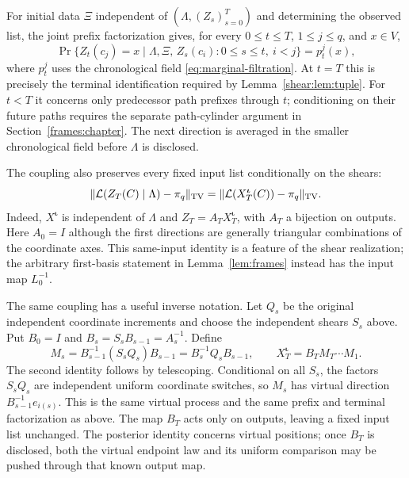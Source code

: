 For initial data $\Xi$ independent of $(\Lambda,(Z_s)_{s=0}^T)$
and determining the observed list, the joint prefix factorization
gives, for every $0\le t\le T$, $1\le j\le q$, and $x\in V$,
\begin{equation}\label{shear:eq:terminal-factorization}
 \Pr\{Z_t(c_j)=x\mid\Lambda,\Xi,\,
              Z_s(c_i):0\le s\le t,\ i<j\}
 =p_t^j(x),
\end{equation}
where $p_t^j$ uses the chronological field
\eqref{eq:marginal-filtration}. At $t=T$ this is precisely the
terminal identification required by Lemma~\ref{shear:lem:tuple}.
For $t<T$ it concerns only predecessor path prefixes through
$t$; conditioning on their future paths requires the separate
path-cylinder argument in Section~\ref{frames:chapter}.
The next direction is averaged in the smaller chronological field
before $\Lambda$ is disclosed.

The coupling also preserves every fixed input list conditionally
on the shears:
\begin{equation}\label{shear:eq:fixed-list-frame}
 \|\mathcal L(Z_T(C)\mid\Lambda)-\pi_q\|_{\mathrm{TV}}
 =\|\mathcal L(X^{\boldsymbol\iota}_T(C))-\pi_q\|_{\mathrm{TV}}.
\end{equation}
Indeed, $X^{\boldsymbol\iota}$ is independent of $\Lambda$ and
$Z_T=A_TX^{\boldsymbol\iota}_T$, with $A_T$ a bijection on
outputs. Here $A_0=I$ although the first directions are generally
triangular combinations of the coordinate axes. This same-input
identity is a feature of the shear realization; the arbitrary
first-basis statement in Lemma~\ref{lem:frames} instead has the
input map $L_0^{-1}$.

\begin{remark}
\label{shear:rem:factorization}
The same coupling has a useful inverse notation. Let $Q_s$ be
the original independent coordinate increments and choose the
independent shears $S_s$ above. Put
$B_0=I$ and $B_s=S_sB_{s-1}=A_s^{-1}$. Define
\begin{equation}\label{shear:eq:inverse-coupling}
 M_s=B_{s-1}^{-1}(S_sQ_s)B_{s-1}
     =B_s^{-1}Q_sB_{s-1},\qquad
 X^{\boldsymbol\iota}_T=B_TM_T\cdots M_1.
\end{equation}
The second identity follows by telescoping. Conditional on all
$S_s$, the factors $S_sQ_s$ are independent uniform coordinate
switches, so $M_s$ has virtual direction
$B_{s-1}^{-1}e_{i(s)}$. This is the same virtual process and the
same prefix and terminal factorization as above. The map $B_T$
acts only on outputs, leaving a fixed input list unchanged.
The posterior identity concerns virtual positions; once $B_T$
is disclosed, both the virtual endpoint law and its uniform
comparison may be pushed through that known output map.
\end{remark}

